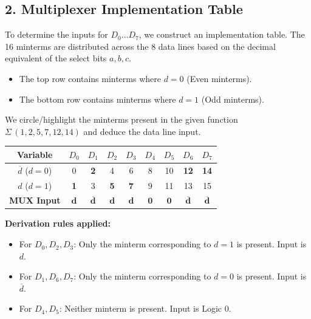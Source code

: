 \documentclass[12pt,a3paper]{article}
\begin{document}
\begin{enumerate}
\begin{tcolorbox}[enhanced,breakable,ansbox,colback=cD!4,colframe=cD,boxrule=0.8pt,arc=5pt,title={\textbf{Answer}},fonttitle=\bfseries\color{white},colbacktitle=cD]
\vspace{0.2cm}
\subsection*{2. Multiplexer Implementation Table}
To determine the inputs for $D_0 \dots D_7$, we construct an implementation table. The 16 minterms are distributed across the 8 data lines based on the decimal equivalent of the select bits $a,b,c$. 
\begin{itemize}
    \item The top row contains minterms where $d = 0$ (Even minterms).
    \item The bottom row contains minterms where $d = 1$ (Odd minterms).
\end{itemize}
We circle/highlight the minterms present in the given function $\Sigma\,(1,2,5,7,12,14)$ and deduce the data line input.

\begin{center}
\renewcommand{\arraystretch}{1.3}
\begin{tabular}{c | c c c c c c c c}
\toprule
\textbf{Variable} & \textbf{$D_0$} & \textbf{$D_1$} & \textbf{$D_2$} & \textbf{$D_3$} & \textbf{$D_4$} & \textbf{$D_5$} & \textbf{$D_6$} & \textbf{$D_7$} \\
\midrule
$\overline{d}$ ($d=0$) & 0 & \textcolor{cD}{\textbf{2}} & 4 & 6 & 8 & 10 & \textcolor{cD}{\textbf{12}} & \textcolor{cD}{\textbf{14}} \\
$d$ ($d=1$) & \textcolor{cD}{\textbf{1}} & 3 & \textcolor{cD}{\textbf{5}} & \textcolor{cD}{\textbf{7}} & 9 & 11 & 13 & 15 \\
\midrule
\textbf{MUX Input} & $\mathbf{d}$ & $\mathbf{\overline{d}}$ & $\mathbf{d}$ & $\mathbf{d}$ & $\mathbf{0}$ & $\mathbf{0}$ & $\mathbf{\overline{d}}$ & $\mathbf{\overline{d}}$ \\
\bottomrule
\end{tabular}
\end{center}

\textbf{Derivation rules applied:}
\begin{itemize}
    \item For $D_0, D_2, D_3$: Only the minterm corresponding to $d=1$ is present. Input is $d$.
    \item For $D_1, D_6, D_7$: Only the minterm corresponding to $d=0$ is present. Input is $\overline{d}$.
    \item For $D_4, D_5$: Neither minterm is present. Input is Logic $0$.
\end{itemize}


\end{tcolorbox}
\end{enumerate}
\end{document}
